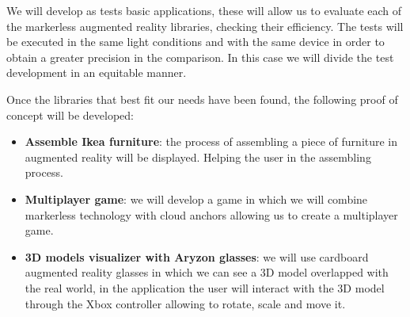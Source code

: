 We will develop as tests basic applications, these will allow us to evaluate each of the markerless augmented reality libraries, checking their efficiency. The tests will be executed in the same light conditions and with the same device in order to obtain a greater precision in the comparison. In this case we will divide the test development in an equitable manner.\vspace{\baselineskip}

Once the libraries that best fit our needs have been found, the following proof of concept will be developed:
\begin{itemize}
\item \textbf{Assemble Ikea furniture}: the process of assembling a piece of furniture in augmented reality will be displayed. Helping the user in the assembling process.
\item \textbf{Multiplayer game}: we will develop a game in which we will combine markerless technology with cloud anchors allowing us to create a multiplayer game.
\item \textbf{3D models visualizer with Aryzon glasses}: we will use cardboard augmented reality glasses in which we can see a 3D model overlapped with the real world, in the application the user will interact with the 3D model through the Xbox controller allowing to rotate, scale and move it.
\end{itemize}
























